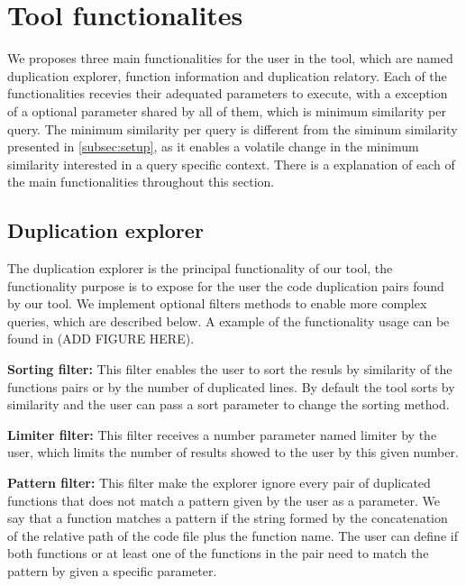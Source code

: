 \en

\section{Tool functionalites}
\label{subsec:func}

We proposes three main functionalities for the user in the tool, which are named duplication explorer, function information
and duplication relatory. Each of the functionalities recevies their adequated parameters to execute, with a exception
of a optional parameter shared by all of them, which is minimum similarity per query. The minimum similarity per query is different
from the siminum similarity presented in \ref{subsec:setup}, as it enables a volatile change in the minimum similarity
interested in a query specific context. There is a explanation of each of the main functionalities throughout this section.

\subsection{Duplication explorer}

The duplication explorer is the principal functionality of our tool, the functionality purpose is to expose for the user the code duplication
pairs found by our tool. We implement optional filters methods to enable more complex queries, which are described below. A example
of the functionality usage can be found in (ADD FIGURE HERE).


\begin{itemize}
	\begin{item}
		\textbf{Sorting filter:} This filter enables the user to sort the resuls by similarity of the functions pairs or 
		by the number of duplicated lines. By default the tool sorts by similarity and the user can pass a sort parameter to change
		the sorting method.
	\end{item}

	\begin{item}
		\textbf{Limiter filter:} This filter receives a number parameter named limiter by the user, which limits the number of results
		showed to the user by this given number.
	\end{item}

	\begin{item}
		\textbf{Pattern filter:} This filter make the explorer ignore every pair of duplicated functions that does not match a pattern
		given by the user as a parameter. We say that a function matches a pattern if the string formed by the concatenation of
		the relative path of the code file plus the function name. The user can define if both functions or at least one of the 
		functions in the pair need to match the pattern by given a specific parameter.
	\end{item}
\end{itemize}


